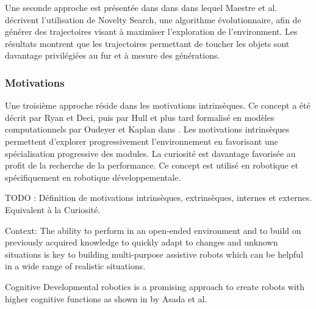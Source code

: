 \documentclass{llncs}
\begin{document}
Une seconde approche est présentée dans dans \cite{Maestre2015} dans lequel Maestre et al. décrivent l'utilisation de Novelty Search, une algorithme évolutionnaire, afin de générer des trajectoires visant à maximiser l'exploration de l'environment. Les résultats montrent que les trajectoires permettant de toucher les objets sont davantage privilégiées au fur et à mesure des générations.




\subsubsection{Motivations}
Une troisième approche réside dans les motivations intrinsèques. Ce concept a été décrit par Ryan et Deci, puis par Hull et plus tard formalisé en modèles computationnels par Oudeyer et Kaplan dans \cite{10.3389/neuro.12.006.2007}. Les motivations intrinsèques permettent d'explorer progressivement l'environnement en favorisant une spécialisation progressive des modules. La curiosité est davantage favorisée au profit de la recherche de la performance. Ce concept est utilisé en robotique et spécifiquement en robotique développementale.

TODO : Définition de motivations intrinsèques, extrinsèques, internes et externes. Equivalent à la Curiosité.








Context: The ability to perform in an open-ended environment and to build on previously acquired knowledge to quickly adapt to changes and unknown situations is key to building
multi-purpose assistive robots which can be helpful in a wide range of realistic situations.

Cognitive Developmental robotics is a promising approach to create robots with higher cognitive functions as shown in \cite{Asada2009} by Asada et al.
\end{document}
